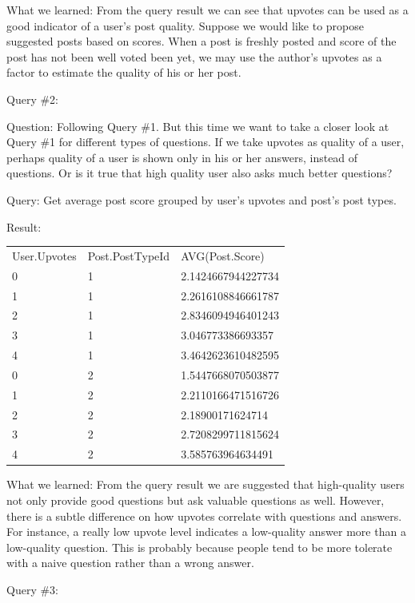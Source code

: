  
 
What we learned:	From the query result we can see that upvotes can be used as a good indicator of a user’s post quality. Suppose we would like to propose suggested posts based on scores. When a post is freshly posted and score of the post has not been well voted been yet, we may use the author’s upvotes as a factor to estimate the quality of his or her post.
 
Query \#2:

Question: 	Following  Query \#1. But this time we want to take a closer look at Query \#1 for different types of questions. If we take upvotes as quality of a user, perhaps quality of a user is shown only in his or her answers, instead of questions. Or is it true that high quality user also asks much better questions?

Query: 		Get average post score grouped by user’s upvotes and post’s post types. 

Result:

\begin {center}
\begin{tabular}{ l l l }
User.Upvotes&Post.PostTypeId&AVG(Post.Score)\\0&1&2.1424667944227734\\1&1&2.2616108846661787\\2&1&2.8346094946401243\\3&1&3.046773386693357\\4&1&3.4642623610482595\\0&2&1.5447668070503877\\1&2&2.2110166471516726\\2&2&2.18900171624714\\3&2&2.7208299711815624\\4&2&3.585763964634491\\
 \end{tabular}
\end {center}


 
What we learned:	From the query result we are suggested that high-quality users not only provide good questions but ask valuable questions as well. However, there is a subtle difference on how upvotes correlate with questions and answers. For instance, a really low upvote level indicates a low-quality answer more than a low-quality question. This is probably because people tend to be more tolerate with a naive question rather than a wrong answer. 
 
Query \#3:

